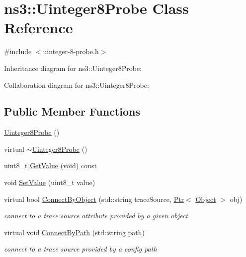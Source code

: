 \hypertarget{classns3_1_1Uinteger8Probe}{}\section{ns3\+:\+:Uinteger8\+Probe Class Reference}
\label{classns3_1_1Uinteger8Probe}


{\ttfamily \#include $<$uinteger-\/8-\/probe.\+h$>$}



Inheritance diagram for ns3\+:\+:Uinteger8\+Probe\+:


Collaboration diagram for ns3\+:\+:Uinteger8\+Probe\+:
\subsection*{Public Member Functions}
\begin{DoxyCompactItemize}
\item 
\hyperlink{classns3_1_1Uinteger8Probe_a4d5967ec2e7cee4aac5ebbf32a95aa96}{Uinteger8\+Probe} ()
\item 
virtual \hyperlink{classns3_1_1Uinteger8Probe_ae601c4e9200b3986c5a337fbeefce9cb}{$\sim$\+Uinteger8\+Probe} ()
\item 
uint8\+\_\+t \hyperlink{classns3_1_1Uinteger8Probe_a6343a72d300563904a371ec78c013e80}{Get\+Value} (void) const 
\item 
void \hyperlink{classns3_1_1Uinteger8Probe_a291f377e1c267549a287ea484e85b2cd}{Set\+Value} (uint8\+\_\+t value)
\item 
virtual bool \hyperlink{classns3_1_1Uinteger8Probe_a92f2aba0dd1892e9d2cf8929bf586b4a}{Connect\+By\+Object} (std\+::string trace\+Source, \hyperlink{classns3_1_1Ptr}{Ptr}$<$ \hyperlink{classns3_1_1Object}{Object} $>$ obj)
\begin{DoxyCompactList}\small\item\em connect to a trace source attribute provided by a given object \end{DoxyCompactList}\item 
virtual void \hyperlink{classns3_1_1Uinteger8Probe_a0628446588b4c495946af78962a5dd0c}{Connect\+By\+Path} (std\+::string path)
\begin{DoxyCompactList}\small\item\em connect to a trace source provided by a config path \end{DoxyCompactList}\end{DoxyCompactItemize}

